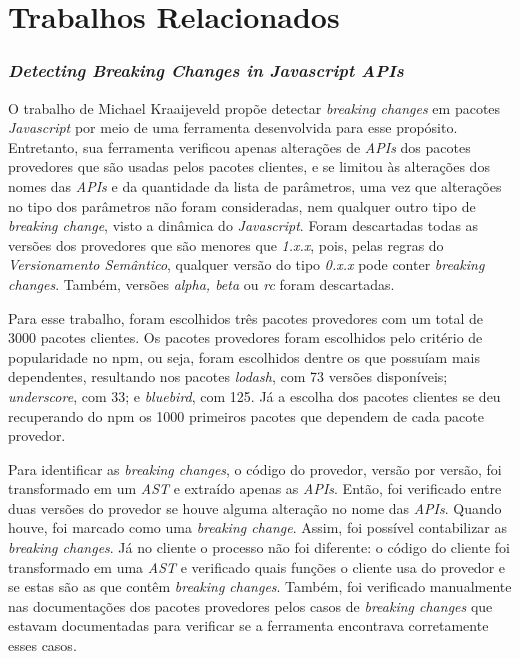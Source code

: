 \section{Trabalhos Relacionados}
\label{sec:related_works}

\subsubsection{\textit{Detecting Breaking Changes in Javascript APIs}}
O trabalho de Michael Kraaijeveld propõe detectar \textit{breaking changes} em pacotes \textit{Javascript} por meio de uma ferramenta desenvolvida para esse propósito. Entretanto, sua ferramenta verificou apenas alterações de \textit{APIs} dos pacotes provedores que são usadas pelos pacotes clientes, e se limitou às alterações dos nomes das \textit{APIs} e da quantidade da lista de parâmetros, uma vez que alterações no tipo dos parâmetros não foram consideradas, nem qualquer outro tipo de \textit{breaking change}, visto a dinâmica do \textit{Javascript}. Foram descartadas todas as versões dos provedores que são menores que \textit{1.x.x}, pois, pelas regras do \textit{Versionamento Semântico}, qualquer versão do tipo \textit{0.x.x} pode conter \textit{breaking changes}. Também, versões \textit{alpha, beta} ou \textit{rc} foram descartadas.

Para esse trabalho, foram escolhidos três pacotes provedores com um total de 3000 pacotes clientes. Os pacotes provedores foram escolhidos pelo critério de popularidade no \gls{npm}, ou seja, foram escolhidos dentre os que possuíam mais dependentes, resultando nos pacotes \textit{lodash}, com 73 versões disponíveis; \textit{underscore}, com 33; e \textit{bluebird}, com 125. Já a escolha dos pacotes clientes se deu recuperando do \gls{npm} os 1000 primeiros pacotes que dependem de cada pacote provedor.

Para identificar as \textit{breaking changes}, o código do provedor, versão por versão, foi transformado em um \textit{AST} e extraído apenas as \textit{APIs}. Então, foi verificado entre duas versões do provedor se houve alguma alteração no nome das \textit{APIs}. Quando houve, foi marcado como uma \textit{breaking change}. Assim, foi possível contabilizar as \textit{breaking changes}. Já no cliente o processo não foi diferente: o código do cliente foi transformado em uma \textit{AST} e verificado quais funções o cliente usa do provedor e se estas são as que contêm \textit{breaking changes}. Também, foi verificado manualmente nas documentações dos pacotes provedores pelos casos de \textit{breaking changes} que estavam documentadas para verificar se a ferramenta encontrava corretamente esses casos.


